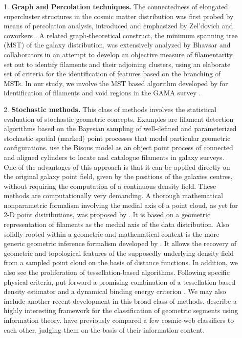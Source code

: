 \begin{itemize}
\item[1.] {\bf Graph and Percolation techniques.} The connectedness of elongated supercluster structures in the cosmic matter distribution 
was first probed by means of percolation analysis, introduced and emphasized by Zel'dovich and coworkers \citep{Zeldovich1982,Shandarin1989,
Shandarin2004}. A related graph-theoretical construct, the minimum spanning tree (MST) of the galaxy distribution, was extensively 
analyzed by Bhavsar and collaborators \citep{Barrow1985, Colberg2007} in an attempt to develop an objective measure of filamentarity. 
\citet{Colberg2007} set out to identify filaments and their adjoining clusters, using an elaborate set of criteria for the identification of 
features based on the branching of MSTs. In our study, we involve the MST based algorithm developed by \cite{2014MNRAS.440L.106A} for identification 
of filaments and void regions in the GAMA survey \citep{Alpaslan2014}. 

\item[2.] {\bf Stochastic methods.} This class of methods involves the statistical evaluation of stochastic geometric concepts. Examples are 
 filament detection algorithms based on the Bayesian sampling of well-defined and parameterized stochastic spatial (marked) point 
processes that model particular geometric configurations. \cite{2010A&A...510A..38S} use the Bisous model as an object point process of connected and aligned cylinders to locate and catalogue filaments in galaxy surveys. One of the advantages of this approach is that it can be applied directly on the original galaxy point field, given by the positions of the galaxies centres, without requiring the computation of a continuous density field. These 
methods are computationally very demanding. A thorough mathematical nonparametric formalism involving the medial axis of a point cloud, as yet 
for 2-D point distributions, was proposed by \cite{Genovese2010}. It is based on a geometric representation of filaments as the medial axis of 
the data distribution. Also solidly rooted within a geometric and mathematical context is the more generic geometric inference formalism 
developed by \cite{Chazal2009}. It allows the recovery of geometric and topological features of the supposedly underlying density field from a 
sampled point cloud on the basis of distance functions. In addition, we also see the proliferation of tessellation-based algorithms. Following 
specific physical criteria, \cite{Gonzalez2010} put forward a promising combination of a tessellation-based density estimator 
and a dynamical binding energy criterion \citep[also see][]{Weygaert2009}. We may also include another recent development in this broad 
class of methods. \cite{Leclercq2015,Leclercq2015c} describe a highly interesting framework for the classification of 
geometric segments using information theory. \cite{Leclercq2016} have  previously compared a few cosmic-web classifiers to each other, judging them on the basis of their information content.
\end{itemize}



